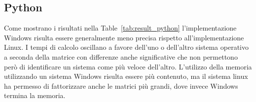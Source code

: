 \documentclass{report}
\begin{document}
            \subsection{Python}
                Come mostrano i risultati nella Table~\ref{tab:result_python} l'implementazione Windows risulta essere 
                generalmente meno precisa rispetto all'implementazione Linux. 
                I tempi di calcolo oscillano a favore dell'uno o dell'altro sistema operativo a seconda della matrice
                con differenze anche significative che non permettono però di identificare un sistema come più
                veloce dell'altro.
                L'utilizzo della memoria utilizzando un sistema Windows risulta essere più contenuto, ma il sistema
                linux ha permesso di fattorizzare anche le matrici più grandi, dove invece Windows termina la memoria.
\end{document}
